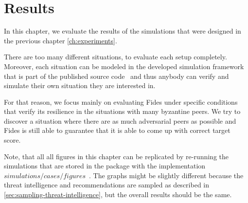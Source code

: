 \chapter{Results}
\label{ch:results}

In this chapter, we evaluate the results of the simulations that were designed in the previous chapter \ref{ch:experiments}.

There are too many different situations, to evaluate each setup completely. Moreover, each situation can be modeled in the developed simulation framework that is part of the published source code~\cite{fidesGithub} and thus anybody can verify and simulate their own situation they are interested in.

For that reason, we focus mainly on evaluating Fides under specific conditions that verify its resilience in the situations with many byzantine peers.
We try to discover a situation where there are as much adversarial peers as possible and Fides is still able to guarantee that it is able to come up with correct target score.

Note, that all all figures in this chapter can be replicated by re-running the simulations that are stored in the package with the implementation $simulations/cases/figures$~\cite{fidesGithub}.
The graphs might be slightly different because the threat intelligence and recommendations are sampled as described in \ref{sec:sampling-threat-intelligence}, but the overall results should be the same.





